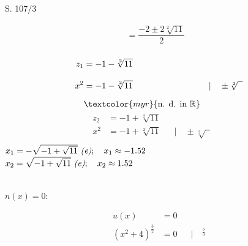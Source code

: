 \begin{Exercise}{S. 107/3}{}
\begin{enumerate}
\begin{enumerate}[label=\alph*),leftmargin=*]
{\begin{itemize}[leftmargin=*]
{\begin{align*}
                        &= \dfrac{-2 \pm 2\sqrt[2]{11}}{2} && \\[-2.0ex]
                    \end{align*}
                    \begin{minipage}[t]{0.35\linewidth}
                        \vspace{-2.0ex}
                        \begin{align*}
                            z_{1} &= -1 - \sqrt[2]{11} &&\\[2.0ex]
                            x^{2} &= -1 - \sqrt[2]{11} &&| \quad \pm \sqrt[2]{\phantom{x}}\\[1.5ex]
                            & \textcolor{myr}{\text{n. d. in } \mathbb{R}} && \\[-2.0ex]
                        \end{align*}
                    \end{minipage}
                    \hfill
                    \vrule
                    \hfill
                    \begin{minipage}[t]{0.60\linewidth}
                        \vspace{-2.0ex}
                        \begin{align*}
                            z_{2} &= -1 + \sqrt[2]{11} &&\\[2.0ex]
                            x^{2} &= -1 + \sqrt[2]{11} &&| \quad \pm \sqrt[2]{\phantom{x}} && \\[-1.5ex]
                        \end{align*}
                        $x_{1} = -\sqrt{-1 + \sqrt{11}} \ \text{\textit{(e)}}; \quad x_{1} \approx \SI{-1.52}{}$\\[2.0ex]
                        $x_{2} = \sqrt{-1 + \sqrt{11}} \ \text{\textit{(e)}}; \quad x_{2} \approx \SI{1.52}{}$\\[-1.0ex]
                    \end{minipage}\\[2.0ex]
                    $n(x) = 0:$\\[-1.0ex]
                    \begin{minipage}[t]{0.45\linewidth}
                        \vspace{-2.0ex}
                        \begin{align*}
                            u(x) &= 0 \\[2.0ex]
                            \left(x^{2} + 4\right)^{\frac{3}{2}} &= 0 &&| \quad ^{\frac{2}{3}}\\[1.5ex]

\end{align*}
\end{minipage}}
\end{itemize}}
\end{enumerate}
\end{enumerate}
\end{Exercise}
